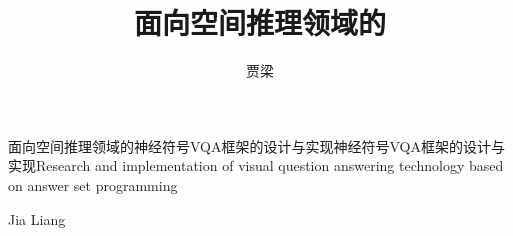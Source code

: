 \title{面向空间推理领域的}{面向空间推理领域的}{神经符号VQA框架的设计与实现}{神经符号VQA框架的设计与实现}{Research and implementation of visual question answering technology }{based on answer set programming}
\author{贾梁}{Jia Liang}
\makebigcover
\makecover
